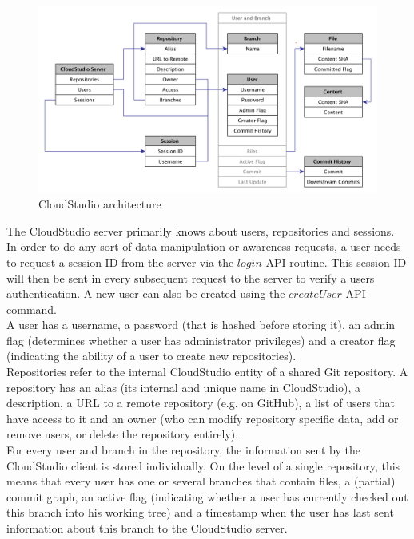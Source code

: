 \begin{figure}[h!]
  \centering
      \includegraphics[width=1\textwidth]{entities}
  \caption{CloudStudio architecture}
  \label{fig:entities}
\end{figure}


The CloudStudio server primarily knows about users, repositories and sessions. \\

In order to do any sort of data manipulation or awareness requests, a user needs to request a session ID from the server via the $login$ API routine. This session ID will then be sent in every subsequent request to the server to verify a users authentication. A new user can also be created using the $createUser$ API command. \\

A user has a username, a password (that is hashed before storing it), an admin flag (determines whether a user has administrator privileges) and a creator flag (indicating the ability of a user to create new repositories). \\

Repositories refer to the internal CloudStudio entity of a shared Git repository. A repository has an alias (its internal and unique name in CloudStudio), a description, a URL to a remote repository (e.g. on GitHub), a list of users that have access to it and an owner (who can modify repository specific data, add or remove users, or delete the repository entirely). \\

For every user and branch in the repository, the information sent by the CloudStudio client is stored individually. On the level of a single repository, this means that every user has one or several branches that contain files, a (partial) commit graph, an active flag (indicating whether a user has currently checked out this branch into his working tree) and a timestamp when the user has last sent information about this branch to the CloudStudio server. \\

